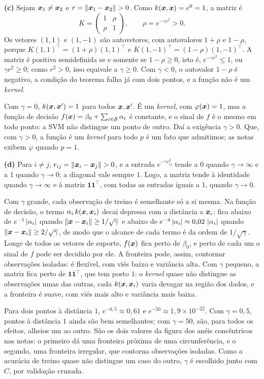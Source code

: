 \documentclass[11pt,a4paper]{article}
\begin{document}
\begin{solucao}
\smallskip
\textbf{(c)} Sejam $\bm{x}_1\ne\bm{x}_2$ e $r=\left\lVert \bm{x}_1-\bm{x}_2 \right\rVert>0$. Como $k(\bm{x},\bm{x})=e^{0}=1$, a
matriz é
\[
  K=\begin{pmatrix}1&\rho\\ \rho&1\end{pmatrix},\qquad \rho=e^{-\gamma r^2}>0 .
\]
Os vetores $(1,1)$ e $(1,-1)$ são autovetores, com autovalores $1+\rho$ e $1-\rho$,
porque $K(1,1)^\top=(1+\rho)(1,1)^\top$ e $K(1,-1)^\top=(1-\rho)(1,-1)^\top$. A matriz
é positiva semidefinida se e somente se $1-\rho\ge0$, isto é, $e^{-\gamma r^2}\le1$,
ou $\gamma r^2\ge0$; como $r^2>0$, isso equivale a $\gamma\ge0$. Com $\gamma<0$, o
autovalor $1-\rho$ é negativo, a condição do teorema falha já com dois pontos, e a
função não é um \emph{kernel}.

Com $\gamma=0$, $k(\bm{x},\bm{x}')=1$ para todos $\bm{x},\bm{x}'$. É um \emph{kernel}, com
$\varphi(\bm{x})=1$, mas a função de decisão
$f(\bm{x})=\beta_0+\sum_{i\in\mathcal S}\alpha_i$ é constante, e o sinal de $f$ é o mesmo
em todo ponto: a SVM não distingue um ponto de outro. Daí a exigência $\gamma>0$. Que,
com $\gamma>0$, a função é um \emph{kernel} para todo $p$ é um fato que admitimos; as
notas exibem $\varphi$ quando $p=1$.

\smallskip
\textbf{(d)} Para $i\ne j$, $r_{ij}=\left\lVert \bm{x}_i-\bm{x}_j \right\rVert>0$, e a entrada
$e^{-\gamma r_{ij}^2}$ tende a $0$ quando $\gamma\to\infty$ e a $1$ quando
$\gamma\to0$; a diagonal vale sempre $1$. Logo, a matriz tende à identidade quando
$\gamma\to\infty$ e à matriz $\bm 1\bm 1^\top$, com todas as entradas iguais a $1$,
quando $\gamma\to0$.

Com $\gamma$ grande, cada observação de treino é semelhante só a si mesma. Na função
de decisão, o termo $\alpha_i\,k(\bm{x},\bm{x}_i)$ decai depressa com a distância a $\bm{x}_i$:
fica abaixo de $e^{-1}\left\lvert \alpha_i \right\rvert$ quando $\left\lVert \bm{x}-\bm{x}_i \right\rVert\ge1/\sqrt\gamma$ e abaixo
de $e^{-4}\left\lvert \alpha_i \right\rvert\approx0{,}02\,\left\lvert \alpha_i \right\rvert$ quando
$\left\lVert \bm{x}-\bm{x}_i \right\rVert\ge2/\sqrt\gamma$, de modo que o alcance de cada termo é da ordem de
$1/\sqrt\gamma$. Longe de todos os vetores de suporte, $f(\bm{x})$ fica perto de $\beta_0$,
e perto de cada um o sinal de $f$ pode ser decidido por ele. A fronteira pode, assim,
contornar observações isoladas: é flexível, com viés baixo e variância alta. Com
$\gamma$ pequeno, a matriz fica perto de $\bm 1\bm 1^\top$, que tem posto $1$: o
\emph{kernel} quase não distingue as observações umas das outras, cada $k(\bm{x},\bm{x}_i)$
varia devagar na região dos dados, e a fronteira é suave, com viés mais alto e
variância mais baixa.

Para dois pontos à distância $1$, $e^{-0{,}5}\approx0{,}61$ e
$e^{-50}\approx1{,}9\times10^{-22}$. Com $\gamma=0{,}5$, pontos à distância $1$ ainda
são bem semelhantes; com $\gamma=50$, são, para todos os efeitos, alheios um ao outro.
São os dois valores da figura dos anéis concêntricos nas notas: o primeiro dá uma
fronteira próxima de uma circunferência, e o segundo, uma fronteira irregular, que
contorna observações isoladas. Como a acurácia de treino quase não distingue um caso
do outro, $\gamma$ é escolhido junto com $C$, por validação cruzada.
\end{solucao}
\end{document}
